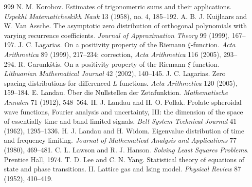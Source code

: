 \begin{thebibliography}{999}
 N. M. Korobov. Estimates of trigonometric sums and their applications. \emph{Uspekhi Matematicheskikh Nauk} 13 (1958), no. 4, 185--192.
 A. B. J. Kuijlaars and W. Van Assche. The asymptotic zero distribution of orthogonal polynomials with varying recurrence coefficients. \emph{Journal of Approximation Theory} 99 (1999), 167--197.
 J. C. Lagarias. On a positivity property of the Riemann $\xi$-function. \emph{Acta Arithmetica} 89 (1999), 217--234; correction, \emph{Acta Arithmetica} 116 (2005), 293--294. %
 R. Garunk\v{s}tis. On a positivity property of the Riemann $\xi$-function. \emph{Lithuanian Mathematical Journal} 42 (2002), 140--145. %
 J. C. Lagarias. Zero spacing distributions for differenced $L$-functions. \emph{Acta Arithmetica} 120 (2005), 159--184.
 E. Landau. \"Uber die Nullstellen der Zetafunktion. \emph{Mathematische Annalen} 71 (1912), 548--564.
 H. J. Landau and H. O. Pollak. Prolate spheroidal wave functions, Fourier analysis and uncertainty, III: the dimension of the space of essentially time and band limited signals. \emph{Bell System Technical Journal} 41 (1962), 1295--1336.
 H. J. Landau and H. Widom. Eigenvalue distribution of time and frequency limiting. \emph{Journal of Mathematical Analysis and Applications} 77 (1980), 469--481.
 C. L. Lawson and R. J. Hanson. \emph{Solving Least Squares Problems}. Prentice Hall, 1974.
 T. D. Lee and C. N. Yang. Statistical theory of equations of state and phase transitions. II. Lattice gas and Ising model. \emph{Physical Review} 87 (1952), 410--419.

\end{thebibliography}
